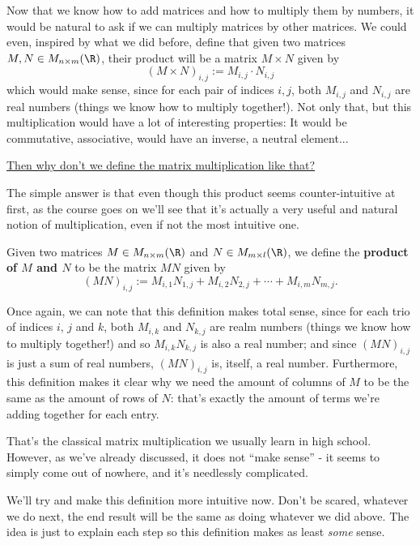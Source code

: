 Now that we know how to add matrices and how to multiply them by numbers, it would be natural to ask if we can multiply matrices by other matrices. We could even, inspired by what we did before, define that given two matrices $M,N\in M_{n\times m}(\R)$, their product will be a matrix $M\times N$ given by
\[(M\times N)_{i,j}:=M_{i,j}\cdot N_{i,j}\]which would make sense, since for each pair of indices $i,j$, both $M_{i,j}$ and $N_{i,j}$ are real numbers (things we know how to multiply together!). Not only that, but this multiplication would have a lot of interesting properties: It would be commutative, associative, would have an inverse, a neutral element...

\underline{Then why don't we define the matrix multiplication like that?}

The simple answer is that even though this product seems counter-intuitive at first, as the course goes on we'll see that it's actually a very useful and natural notion of multiplication, even if not the most intuitive one.

\begin{df}\label{df:produto-classico}
	Given two matrices $M\in M_{n\times m}(\R)$ and $N\in M_{m\times l}(\R)$, we define the \textbf{product of $M$ and $N$} to be the matrix $MN$ given by
	\[(MN)_{i,j}:=M_{i,1}N_{1,j}+M_{i,2}N_{2,j}+\cdots+M_{i,m}N_{m,j}.\]
\end{df}

\begin{rmk}
	Once again, we can note that this definition makes total sense, since for each trio of indices $i$, $j$ and $k$, both $M_{i,k}$ and $N_{k,j}$ are realm numbers (things we know how to multiply together!) and so $M_{i,k}N_{k,j}$ is also a real number; and since $(MN)_{i,j}$ is just a sum of real numbers, $(MN)_{i,j}$ is, itself, a real number. Furthermore, this definition makes it clear why we need the amount of columns of $M$ to be the same as the amount of rows of $N$: that's exactly the amount of terms we're adding together for each entry.
\end{rmk}

That's the classical matrix multiplication we usually learn in high school. However, as we've already discussed, it does not ``make sense'' - it seems to simply come out of nowhere, and it's needlessly complicated.

We'll try and make this definition more intuitive now. Don't be scared, whatever we do next, the end result will be the same as doing whatever we did above. The idea is just to explain each step so this definition makes as least \textit{some} sense.

